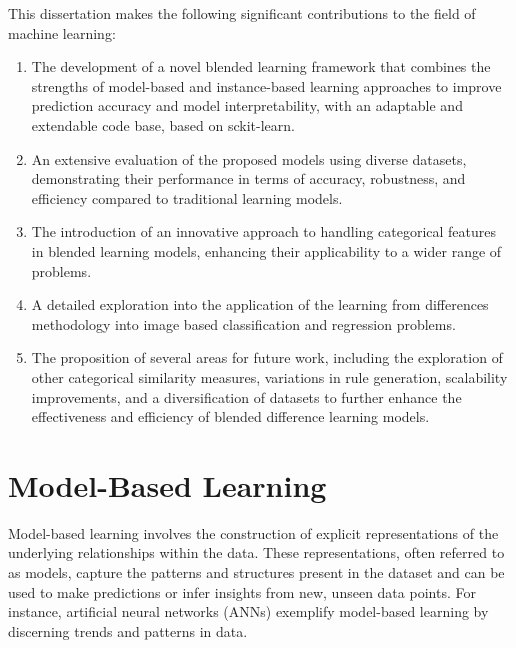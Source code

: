 \documentclass[a4paper, 12pt]{report}
\begin{document}
This dissertation makes the following significant contributions to the field of machine learning:

\begin{enumerate}
    \item The development of a novel blended learning framework that combines the strengths of model-based and instance-based 
    learning approaches to improve prediction accuracy and model interpretability, with an adaptable and extendable code base, based on sckit-learn.
    
    \item An extensive evaluation of the proposed models using diverse datasets, demonstrating their performance in terms of accuracy,
     robustness, and efficiency compared to traditional learning models.
    
    \item The introduction of an innovative approach to handling categorical features in blended learning models, enhancing their 
    applicability to a wider range of problems.
    
    \item A detailed exploration into the application of the learning from differences methodology into image based classification and 
    regression problems.
    
    \item The proposition of several areas for future work, including the exploration of other categorical similarity measures, variations in rule generation, scalability improvements, and a diversification of datasets to further enhance the effectiveness 
    and efficiency of blended difference learning models.
\end{enumerate}
\section{Model-Based Learning}

Model-based learning involves the construction of explicit representations of the underlying relationships within the data.
These representations, often referred to as models, capture the patterns and structures present in the dataset and can be used to make predictions or infer insights from new, unseen data points.
For instance, artificial neural networks (ANNs) exemplify model-based learning by discerning trends and patterns in data.
\end{document}
